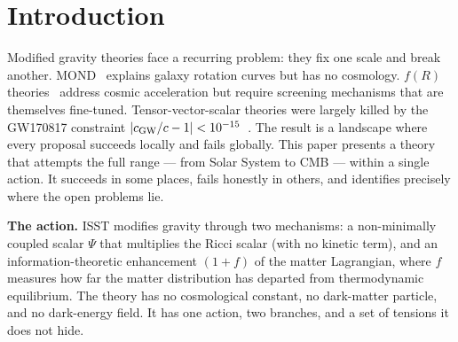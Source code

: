 \documentclass[aps,prd,twocolumn,nofootinbib,floatfix,superscriptaddress]{revtex4-2}
\begin{document}
\maketitle
\thispagestyle{fancy}

\section{Introduction}
\label{sec:intro}

Modified gravity theories face a recurring problem: they fix one
scale and break another. MOND~\cite{Milgrom1983} explains galaxy
rotation curves but has no cosmology. $f(R)$
theories~\cite{Sotiriou2010} address cosmic acceleration but
require screening mechanisms that are themselves fine-tuned.
Tensor-vector-scalar theories were largely killed by the GW170817
constraint $|c_{\rm GW}/c - 1| < 10^{-15}$~\cite{LIGO2017,Creminelli2017}.
The result is a landscape where every proposal succeeds locally and
fails globally. This paper presents a theory that attempts the full
range --- from Solar System to CMB --- within a single action. It
succeeds in some places, fails honestly in others, and identifies
precisely where the open problems lie.

\textbf{The action.} ISST modifies gravity through two mechanisms:
a non-minimally coupled scalar $\Psi$ that multiplies the Ricci
scalar (with no kinetic term), and an information-theoretic
enhancement $(1{+}f)$ of the matter Lagrangian, where $f$ measures
how far the matter distribution has departed from thermodynamic
equilibrium. The theory has no cosmological constant, no
dark-matter particle, and no dark-energy field. It has one action,
two branches, and a set of tensions it does not hide.
\end{document}
